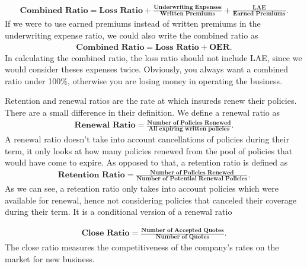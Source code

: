 \documentclass[11pt, english]{memoir}
\numberwithin{definition}{section}
\begin{document}
	
	\begin{tcolorbox}[adjusted title = \textbf{Combined Ratio}, boxrule = 0mm]
		\begin{align*}
		\textbf{Combined Ratio} = \textbf{Loss Ratio} + \frac{\textbf{Underwriting Expenses}}{\textbf{Written Premiums}} + \frac{\textbf{LAE}}{\textbf{Earned Premiums}} .
		\end{align*}
		If we were to use earned premiums instead of written premiums in the underwriting expense ratio, we could also write the combined ratio as 
		\begin{align*}
		\textbf{Combined Ratio} = \textbf{Loss Ratio} + \textbf{OER}.
		\end{align*}
		In calculating the combined ratio, the loss ratio should not include LAE, since we would consider theses expenses twice. Obviously, you always want a combined ratio under 100\%, otherwise you are losing money in operating the business. 
	\end{tcolorbox}
	
	
	
	\begin{tcolorbox}[adjusted title = \textbf{Renewal/Retention Ratio}, boxrule = 0mm]
		Retention and renewal ratios are the rate at which insureds renew their policies. There are a small difference in their definition. We define a renewal ratio as 
		\begin{align*}
		\textbf{Renewal Ratio} =  \frac{\textbf{Number of Policies Renewed}}{\textbf{All expiring written policies}}.
		\end{align*}
		A renewal ratio doesn't take into account cancellations of policies during their term, it only looks at how many policies renewed from the pool of policies that would have come to expire. As opposed to that, a retention ratio is defined as 
		\begin{align*}
		\textbf{Retention Ratio} = \frac{\textbf{Number of Policies Renewed}}{\textbf{Number of Potential Renewal Policies}}.
		\end{align*}
		As we can see, a retention ratio only takes into account policies which were available for renewal, hence not considering policies that canceled their coverage during their term. It is a conditional version of a renewal ratio
	\end{tcolorbox}
	
	
	\begin{tcolorbox}[adjusted title = \textbf{Close Ratio}, boxrule = 0mm]
		\begin{align*}
		\textbf{Close Ratio} = \frac{\textbf{Number of Accepted Quotes}}{\textbf{Number of Quotes}}.
		\end{align*}
		The close ratio measures the competitiveness of the company's rates on the market for new business. 
	\end{tcolorbox}
	
\end{document}
